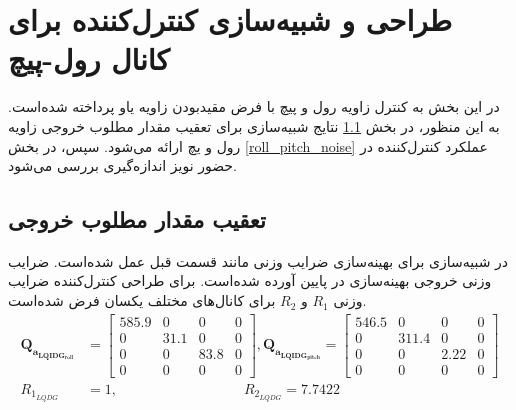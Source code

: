 \section{طراحی و شبیه‌سازی کنترل‌کننده برای کانال رول-پیچ}
\label{roll_pitch_lqidg_section_simulation_label}
در این بخش به کنترل زاویه رول و پیچ با فرض مقید‌بودن زاویه یاو پرداخته شده‌است. به این منظور، در بخش
\ref{roll_pitch_regulator}
نتایج شبیه‌سازی برای تعقیب مقدار مطلوب خروجی زاویه رول و یچ ارائه می‌شود. سپس، در بخش
\ref{roll_pitch_noise}
عملکرد کنترل‌کننده در  حضور نویز اندازه‌گیری بررسی می‌شود.
\subsection{تعقیب مقدار مطلوب خروجی}\label{roll_pitch_regulator}

 در شبیه‌سازی برای بهینه‌سازی ضرایب وزنی مانند قسمت قبل عمل شده‌است.
 ضرایب وزنی خروجی بهینه‌سازی در پایین آورده شده‌است. برای طراحی کنترل‌کننده
ضرایب وزنی
$R_1$
و
$R_2$
برای کانال‌های مختلف یکسان فرض شده‌است.
\begin{equation}
	\begin{split}
		\boldsymbol{Q_{a_{LQIDG_{roll}}}} &= \begin{bmatrix}
			585.9 &0& 0& 0\\
			0 &  31.1 & 0 &0 \\
			0 & 0 & 83.8 & 0\\
			0 & 0 & 0 & 0
		\end{bmatrix} ,
	\boldsymbol{Q_{a_{LQIDG_{pitch}}}} = \begin{bmatrix}
		546.5 &0& 0& 0\\
		0 &  311.4 & 0 &0 \\
		0 & 0 & 2.22 & 0\\
		0 & 0 & 0 & 0
		\end{bmatrix}\\
	R_{1_{LQDG}} &=  1,\qquad  \qquad \qquad \qquad \quad R_{2_{LQDG}} =  7.7422
	\end{split}
\end{equation}

